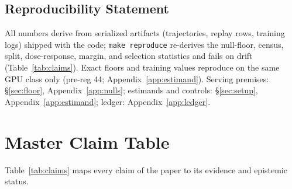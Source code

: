 \documentclass{article}
\theoremstyle{remark}
\begin{document}
\subsection*{Reproducibility Statement}
All numbers derive from serialized artifacts (trajectories, replay rows,
training logs) shipped with the code; \texttt{make reproduce} re-derives
the null-floor, census, split, dose-response, margin, and selection
statistics and fails on drift (Table~\ref{tab:claims}). Exact floors and
training values reproduce on the same GPU class only (pre-reg 44;
Appendix~\ref{app:estimand}). Serving premises:
\S\ref{sec:floor}, Appendix~\ref{app:nulls}; estimands and controls:
\S\ref{sec:setup}, Appendix~\ref{app:estimand}; ledger:
Appendix~\ref{app:ledger}.




\appendix
\section{Master Claim Table}
\label{app:claims}
Table~\ref{tab:claims} maps every claim of the paper to its evidence
and epistemic status.
\end{document}
